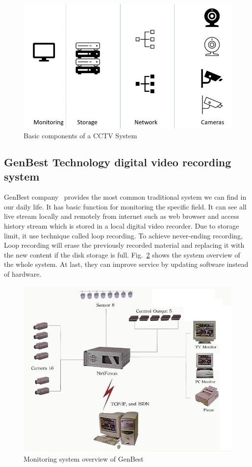 \begin{figure}[H]
    \centering
    \includegraphics[width=\textwidth]{figsrc/cctv_system.png}
    \caption{Basic components of a CCTV System\label{fig:cctv_system}}
\end{figure}

\subsection{GenBest Technology digital video recording system}
GenBest company~\cite{genbest-LTD} provides the most common traditional system we can find in our daily life. It has basic function for monitoring the specific field. It can see all live stream locally and remotely from internet such as web browser and access history stream which is stored in a local digital video recorder. Due to storage limit, it use technique called loop recording. To achieve never-ending recording, Loop recording will erase the previously recorded material and replacing it with the new content if the disk storage is full. Fig.~\ref{fig:genbest_system} shows the system overview of the whole system. At last, they can improve service by updating software instead of hardware.

\begin{figure}[H]
    \centering
    \includegraphics[width=\textwidth]{figsrc/genbest_system.jpeg}
    \caption{Monitoring system overview of GenBest\label{fig:genbest_system}}
\end{figure}

